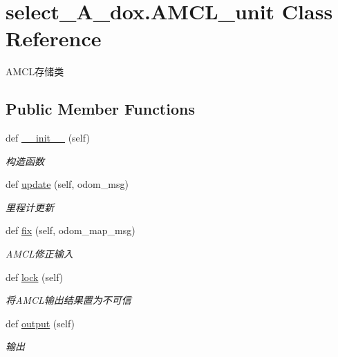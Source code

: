 \hypertarget{classselect___a__dox_1_1_a_m_c_l__unit}{}\section{select\+\_\+\+A\+\_\+dox.\+A\+M\+C\+L\+\_\+unit Class Reference}
\label{classselect___a__dox_1_1_a_m_c_l__unit}


A\+M\+C\+L存储类  


\subsection*{Public Member Functions}
\begin{DoxyCompactItemize}
\item 
def \hyperlink{classselect___a__dox_1_1_a_m_c_l__unit_a75ef8e5b279e2dde8972ba0a09cd2ff5}{\+\_\+\+\_\+init\+\_\+\+\_\+} (self)
\begin{DoxyCompactList}\small\item\em 构造函数 \end{DoxyCompactList}\item 
def \hyperlink{classselect___a__dox_1_1_a_m_c_l__unit_a9c81d73d5e22dc32abd7678cf7f70cc9}{update} (self, odom\+\_\+msg)
\begin{DoxyCompactList}\small\item\em 里程计更新 \end{DoxyCompactList}\item 
def \hyperlink{classselect___a__dox_1_1_a_m_c_l__unit_a1f6f020f331d34d9b98d93c29597906c}{fix} (self, odom\+\_\+map\+\_\+msg)
\begin{DoxyCompactList}\small\item\em A\+M\+C\+L修正输入 \end{DoxyCompactList}\item 
def \hyperlink{classselect___a__dox_1_1_a_m_c_l__unit_a75cca19313b32fbed7fbd1181c06761c}{lock} (self)
\begin{DoxyCompactList}\small\item\em 将\+A\+M\+C\+L输出结果置为不可信 \end{DoxyCompactList}\item 
def \hyperlink{classselect___a__dox_1_1_a_m_c_l__unit_a82003fb543cb2eba9752b571e2b1afdd}{output} (self)
\begin{DoxyCompactList}\small\item\em 输出 \end{DoxyCompactList}\end{DoxyCompactItemize}
